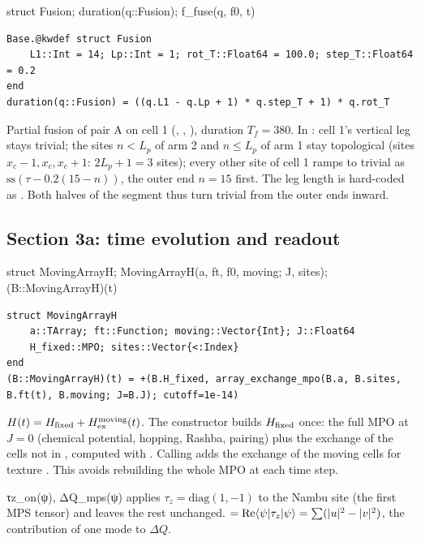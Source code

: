 \begin{function}{struct Fusion; duration(q::Fusion); f\_fuse(q, f0, t)}
\begin{Verbatim}
Base.@kwdef struct Fusion
    L1::Int = 14; Lp::Int = 1; rot_T::Float64 = 100.0; step_T::Float64 = 0.2
end
duration(q::Fusion) = ((q.L1 - q.Lp + 1) * q.step_T + 1) * q.rot_T
\end{Verbatim}
Partial fusion of pair A on cell 1 (, , ), duration $T_f = 380$. In
: cell 1's vertical leg stays trivial; the sites $n < L_p$ of arm 2 and $n\le L_p$ of arm 1 stay topological (sites
$x_c-1, x_c, x_c+1$: $2L_p+1 = 3$ sites); every other site of cell 1 ramps to trivial as $\mathrm{ss}(\tau - 0.2(15-n))$, the outer end
$n = 15$ first. The leg length is hard-coded as . Both halves of the segment thus turn trivial from the outer ends inward.
\end{function}

\subsection{Section 3a: time evolution and readout}

\begin{function}{struct MovingArrayH; MovingArrayH(a, ft, f0, moving; J, sites); (B::MovingArrayH)(t)}
\begin{Verbatim}
struct MovingArrayH
    a::TArray; ft::Function; moving::Vector{Int}; J::Float64
    H_fixed::MPO; sites::Vector{<:Index}
end
(B::MovingArrayH)(t) = +(B.H_fixed, array_exchange_mpo(B.a, B.sites, B.ft(t), B.moving; J=B.J); cutoff=1e-14)
\end{Verbatim}
$H(t) = H_{\rm fixed} + H_{\rm ex}^{\rm moving}(t)$. The constructor builds $H_{\rm fixed}$ once: the full MPO at $J = 0$ (chemical
potential, hopping, Rashba, pairing) plus the exchange of the cells not in , computed with . Calling 
adds the exchange of the moving cells for texture . This avoids rebuilding the whole MPO at each time step.
\end{function}

\begin{function}{τz\_on(ψ), ΔQ\_mps(ψ)}
 applies $\tau_z = \mathrm{diag}(1,-1)$ to the Nambu site (the first MPS tensor) and leaves the rest unchanged.
 $= \mathrm{Re}\langle\psi|\tau_z|\psi\rangle = \sum(|u|^2 - |v|^2)$, the contribution of one mode to $\Delta Q$.
\end{function}

